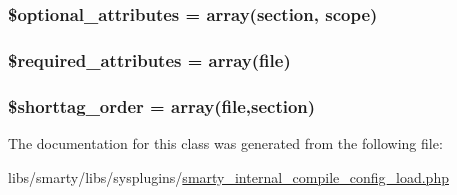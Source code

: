 \subsubsection[{\$optional\+\_\+attributes}]{\setlength{\rightskip}{0pt plus 5cm}\$optional\+\_\+attributes = array(\textquotesingle{}section\textquotesingle{}, \textquotesingle{}scope\textquotesingle{})}\label{class_smarty___internal___compile___config___load_a899d1eb4a6fecbd6ce696adb171c80a4}
\hypertarget{class_smarty___internal___compile___config___load_ae799507d5461de485f3a618abeecea95}{}
\subsubsection[{\$required\+\_\+attributes}]{\setlength{\rightskip}{0pt plus 5cm}\$required\+\_\+attributes = array(\textquotesingle{}file\textquotesingle{})}\label{class_smarty___internal___compile___config___load_ae799507d5461de485f3a618abeecea95}
\hypertarget{class_smarty___internal___compile___config___load_a2ccb25269c3a92e8c4796c7ef23725e6}{}
\subsubsection[{\$shorttag\+\_\+order}]{\setlength{\rightskip}{0pt plus 5cm}\$shorttag\+\_\+order = array(\textquotesingle{}file\textquotesingle{},\textquotesingle{}section\textquotesingle{})}\label{class_smarty___internal___compile___config___load_a2ccb25269c3a92e8c4796c7ef23725e6}


The documentation for this class was generated from the following file\+:\begin{DoxyCompactItemize}
\item 
libs/smarty/libs/sysplugins/\hyperlink{smarty__internal__compile__config__load_8php}{smarty\+\_\+internal\+\_\+compile\+\_\+config\+\_\+load.\+php}\end{DoxyCompactItemize}
